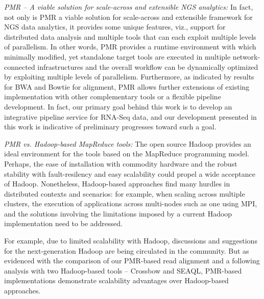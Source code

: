 \documentclass{acm_proc_article-sp}
\begin{document}

\textit{PMR -- A viable solution for scale-across and extensible NGS
  analytics:} In fact, not only is PMR a viable solution for
scale-across and extensible framework for NGS data analytics, it
provides some unique features, viz., support for distributed data
analysis and multiple tools that can each exploit multiple levels of
parallelism.  In other words, PMR provides a runtime environment with
which minimally modified, yet standalone target tools are executed in
multiple network-connected infrastructures and the overall workflow
can be dynamically optimized by exploiting multiple levels of
parallelism. Furthermore, as indicated by results for BWA and Bowtie
for alignment, PMR allows further extensions of existing
implementation with other complementary tools or a flexible pipeline
development.  In fact, our primary goal behind this work is to develop
an integrative pipeline service for RNA-Seq data, and our development
presented in this work is indicative of preliminary progresses toward
such a goal.

\textit{PMR vs. Hadoop-based MapReduce tools: }The open source Hadoop
provides an ideal environment for the tools based on the MapReduce
programming model.  Perhaps, the ease of installation with commodity
hardware and the robust stability with fault-resilency and easy
scalability could propel a wide acceptance of Hadoop.  Nonetheless,
Hadoop-based approaches find many hurdles in distributed contexts and
scenarios: for example, when scaling across multiple
clusters\cite{weissman-mr-11}, the execution of applications across
multi-nodes such as one using MPI, and the solutions involving the
limitations imposed by a current Hadoop implementation need to be
addressed.

For example, due to limited scalability with Hadoop, discussions and
suggestions for the next-generation Hadoop are being circulated in the
community\cite{ng-hadoop-url}.  But as evidenced with the comparison of
our PMR-based read alignment and a following analysis with two
Hadoop-based tools -- Crossbow and SEAQL, PMR-based implementations
demonstrate scalability advantages over Hadoop-based approaches.
\end{document}
